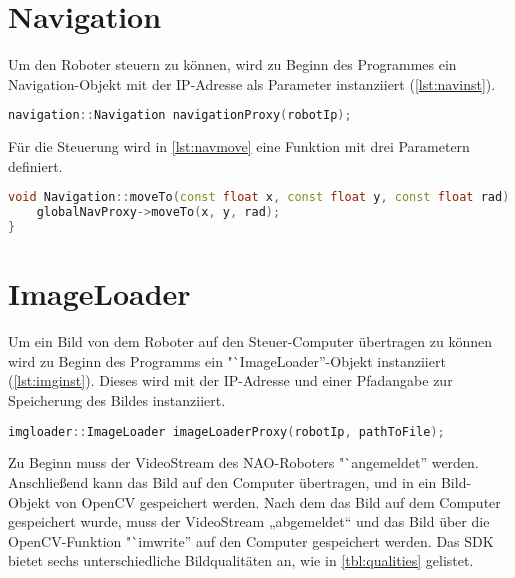     \section{Navigation}

        Um den Roboter steuern zu können, wird zu Beginn des Programmes ein
        Navigation-Objekt mit der \ac{IP}-Adresse als Parameter instanziiert
        (\autoref{lst:navinst}).

\begin{lstlisting}[language=c++,
                   caption={Navigation Instanziierung},
                   label={lst:navinst}]
navigation::Navigation navigationProxy(robotIp);
\end{lstlisting}

        Für die Steuerung wird in \autoref{lst:navmove} eine Funktion mit drei
        Parametern definiert.

\begin{lstlisting}[language=c++,
                   caption={Funktion: "`moveTo''},
                   label={lst:navmove}]
void Navigation::moveTo(const float x, const float y, const float rad) {
    globalNavProxy->moveTo(x, y, rad);
}
\end{lstlisting}

    \section{ImageLoader}

        Um ein Bild von dem Roboter auf den Steuer-Computer übertragen zu können
        wird zu Beginn des Programms ein "`ImageLoader''-Objekt instanziiert
        (\autoref{lst:imginst}).
        Dieses wird mit der \ac{IP}-Adresse und einer Pfadangabe zur Speicherung
        des Bildes instanziiert.

\begin{lstlisting}[language=c++,
                   caption={ImageLoader Instanziierung},
                   label={lst:imginst}]
imgloader::ImageLoader imageLoaderProxy(robotIp, pathToFile);
\end{lstlisting}

        Zu Beginn muss der VideoStream des NAO-Roboters "`angemeldet'' werden.
        Anschließend kann das Bild auf den Computer übertragen, und in ein
        Bild-Objekt von OpenCV gespeichert werden.
        Nach dem das Bild auf dem Computer gespeichert wurde, muss der
        VideoStream „abgemeldet“ und das Bild über die OpenCV-Funktion
        "`imwrite'' auf den Computer gespeichert werden.
        Das SDK bietet sechs unterschiedliche Bildqualitäten an, wie in
        \autoref{tbl:qualities} gelistet.

